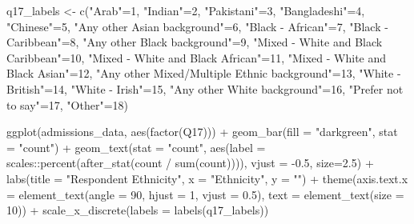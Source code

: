 \documentclass[
  letterpaper,
  DIV=11,
  numbers=noendperiod]{scrartcl}
\newenvironment{Shaded}{\begin{snugshade}}{\end{snugshade}}
\newcommand{\AttributeTok}[1]{\textcolor[rgb]{0.40,0.45,0.13}{#1}}
\newcommand{\DecValTok}[1]{\textcolor[rgb]{0.68,0.00,0.00}{#1}}
\newcommand{\FloatTok}[1]{\textcolor[rgb]{0.68,0.00,0.00}{#1}}
\newcommand{\FunctionTok}[1]{\textcolor[rgb]{0.28,0.35,0.67}{#1}}
\newcommand{\NormalTok}[1]{\textcolor[rgb]{0.00,0.23,0.31}{#1}}
\newcommand{\OtherTok}[1]{\textcolor[rgb]{0.00,0.23,0.31}{#1}}
\newcommand{\SpecialCharTok}[1]{\textcolor[rgb]{0.37,0.37,0.37}{#1}}
\newcommand{\StringTok}[1]{\textcolor[rgb]{0.13,0.47,0.30}{#1}}
\begin{document}
\begin{Shaded}
\begin{Highlighting}[]
\NormalTok{q17\_labels }\OtherTok{\textless{}{-}} \FunctionTok{c}\NormalTok{(}\StringTok{"Arab"}\OtherTok{=}\DecValTok{1}\NormalTok{, }\StringTok{"Indian"}\OtherTok{=}\DecValTok{2}\NormalTok{, }\StringTok{"Pakistani"}\OtherTok{=}\DecValTok{3}\NormalTok{, }\StringTok{"Bangladeshi"}\OtherTok{=}\DecValTok{4}\NormalTok{, }\StringTok{"Chinese"}\OtherTok{=}\DecValTok{5}\NormalTok{, }\StringTok{"Any other Asian background"}\OtherTok{=}\DecValTok{6}\NormalTok{, }\StringTok{"Black {-} African"}\OtherTok{=}\DecValTok{7}\NormalTok{, }\StringTok{"Black {-} Caribbean"}\OtherTok{=}\DecValTok{8}\NormalTok{, }\StringTok{"Any other Black background"}\OtherTok{=}\DecValTok{9}\NormalTok{, }\StringTok{"Mixed {-} White and Black Caribbean"}\OtherTok{=}\DecValTok{10}\NormalTok{, }\StringTok{"Mixed {-} White and Black African"}\OtherTok{=}\DecValTok{11}\NormalTok{, }\StringTok{"Mixed {-} White and Black Asian"}\OtherTok{=}\DecValTok{12}\NormalTok{, }\StringTok{"Any other Mixed/Multiple Ethnic background"}\OtherTok{=}\DecValTok{13}\NormalTok{, }\StringTok{"White {-} British"}\OtherTok{=}\DecValTok{14}\NormalTok{, }\StringTok{"White {-} Irish"}\OtherTok{=}\DecValTok{15}\NormalTok{, }\StringTok{"Any other White background"}\OtherTok{=}\DecValTok{16}\NormalTok{, }\StringTok{"Prefer not to say"}\OtherTok{=}\DecValTok{17}\NormalTok{, }\StringTok{"Other"}\OtherTok{=}\DecValTok{18}\NormalTok{)}

\FunctionTok{ggplot}\NormalTok{(admissions\_data, }\FunctionTok{aes}\NormalTok{(}\FunctionTok{factor}\NormalTok{(Q17))) }\SpecialCharTok{+}
  \FunctionTok{geom\_bar}\NormalTok{(}\AttributeTok{fill =} \StringTok{"darkgreen"}\NormalTok{, }\AttributeTok{stat =} \StringTok{"count"}\NormalTok{) }\SpecialCharTok{+}
  \FunctionTok{geom\_text}\NormalTok{(}\AttributeTok{stat =} \StringTok{"count"}\NormalTok{, }\FunctionTok{aes}\NormalTok{(}\AttributeTok{label =}\NormalTok{ scales}\SpecialCharTok{::}\FunctionTok{percent}\NormalTok{(}\FunctionTok{after\_stat}\NormalTok{(count }\SpecialCharTok{/} \FunctionTok{sum}\NormalTok{(count)))), }\AttributeTok{vjust =} \SpecialCharTok{{-}}\FloatTok{0.5}\NormalTok{, }\AttributeTok{size=}\FloatTok{2.5}\NormalTok{) }\SpecialCharTok{+}  
  \FunctionTok{labs}\NormalTok{(}\AttributeTok{title =} \StringTok{"Respondent Ethnicity"}\NormalTok{, }\AttributeTok{x =} \StringTok{"Ethnicity"}\NormalTok{, }\AttributeTok{y =} \StringTok{""}\NormalTok{) }\SpecialCharTok{+}
  \FunctionTok{theme}\NormalTok{(}\AttributeTok{axis.text.x =} \FunctionTok{element\_text}\NormalTok{(}\AttributeTok{angle =} \DecValTok{90}\NormalTok{, }\AttributeTok{hjust =} \DecValTok{1}\NormalTok{, }\AttributeTok{vjust =} \FloatTok{0.5}\NormalTok{), }\AttributeTok{text =} \FunctionTok{element\_text}\NormalTok{(}\AttributeTok{size =} \DecValTok{10}\NormalTok{)) }\SpecialCharTok{+} \FunctionTok{scale\_x\_discrete}\NormalTok{(}\AttributeTok{labels =} \FunctionTok{labels}\NormalTok{(q17\_labels))}
\end{Highlighting}
\end{Shaded}
\end{document}
